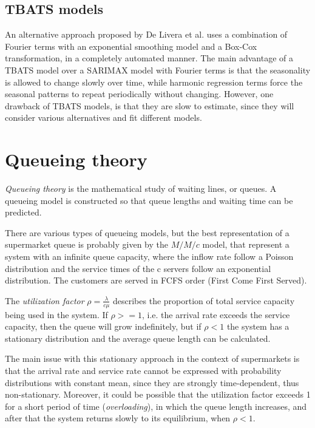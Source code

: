 \subsection{TBATS models}
\label{subsec:tbats_models}
An alternative approach proposed by De Livera et al. \cite{de_livera} uses a combination of Fourier terms with an exponential smoothing model and a Box-Cox transformation, in a completely automated manner. The main advantage of a TBATS model over a SARIMAX model with Fourier terms is that the seasonality is allowed to change slowly over time, while harmonic regression terms force the seasonal patterns to repeat periodically without changing. However, one drawback of TBATS models, is that they are slow to estimate, since they will consider various alternatives and fit different models.


\section{Queueing theory}
\label{sec:queueing_theory}

\emph{Queueing theory} is the mathematical study of waiting lines, or queues. A queueing model is constructed so that queue lengths and waiting time can be predicted.

There are various types of queueing models, but the best representation of a supermarket queue is probably given by the \( M/M/c \) model, that represent a system with an infinite queue capacity, where the inflow rate follow a Poisson distribution and the service times of the c servers follow an exponential distribution. The customers are served in FCFS order (First Come First Served).

The \emph{utilization factor} \( \rho = \frac{\lambda}{c\mu} \) describes the proportion of total service capacity being used in the system. If \( \rho >= 1\), i.e. the arrival rate exceeds the service capacity, then the queue will grow indefinitely, but if \( \rho < 1\) the system has a stationary distribution and the average queue length can be calculated.

The main issue with this stationary approach in the context of supermarkets is that the arrival rate and service rate cannot be expressed with probability distributions with constant mean, since they are strongly time-dependent, thus non-stationary. Moreover, it could be possible that the utilization factor exceeds 1 for a short period of time (\emph{overloading}), in which the queue length increases, and after that the system returns slowly to its equilibrium, when \( \rho < 1\).

